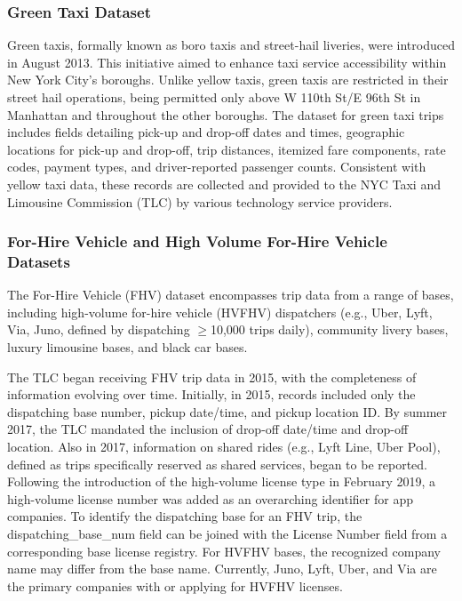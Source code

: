 \documentclass[conference]{IEEEtran}
\begin{document}
\subsubsection*{Green Taxi Dataset}
Green taxis, formally known as boro taxis and street-hail liveries, were introduced in August 2013. This initiative
aimed to enhance taxi service accessibility within New York City's boroughs. Unlike yellow taxis, green taxis are
restricted in their street hail operations, being permitted only above W 110th St/E 96th St in Manhattan and throughout
the other boroughs.
The dataset for green taxi trips includes fields detailing pick-up and drop-off dates and times, geographic locations
for pick-up and drop-off, trip distances, itemized fare components, rate codes, payment types, and driver-reported
passenger counts. Consistent with yellow taxi data, these records are collected and provided to the NYC Taxi and
Limousine Commission (TLC) by various technology service providers.

\subsubsection*{For-Hire Vehicle and High Volume For-Hire Vehicle Datasets} The For-Hire Vehicle (FHV) dataset
encompasses trip data from a range of bases, including high-volume for-hire vehicle (HVFHV) dispatchers (e.g., Uber,
Lyft, Via, Juno, defined by dispatching $\ge$10,000 trips daily), community livery bases, luxury limousine bases,
and black car bases.

The TLC began receiving FHV trip data in 2015, with the completeness of information evolving over time. Initially,
in 2015, records included only the dispatching base number, pickup date/time, and pickup location ID. By summer 2017,
the TLC mandated the inclusion of drop-off date/time and drop-off location. Also in 2017, information on shared rides
(e.g., Lyft Line, Uber Pool), defined as trips specifically reserved as shared services, began to be reported. Following
the introduction of the high-volume license type in February 2019, a high-volume license number was added as an
overarching identifier for app companies.
To identify the dispatching base for an FHV trip, the dispatching\_base\_num field can be joined with the License Number
field from a corresponding base license registry. For HVFHV bases, the recognized company name may differ from the base
name. Currently, Juno, Lyft, Uber, and Via are the primary companies with or applying for HVFHV licenses.
\end{document}
